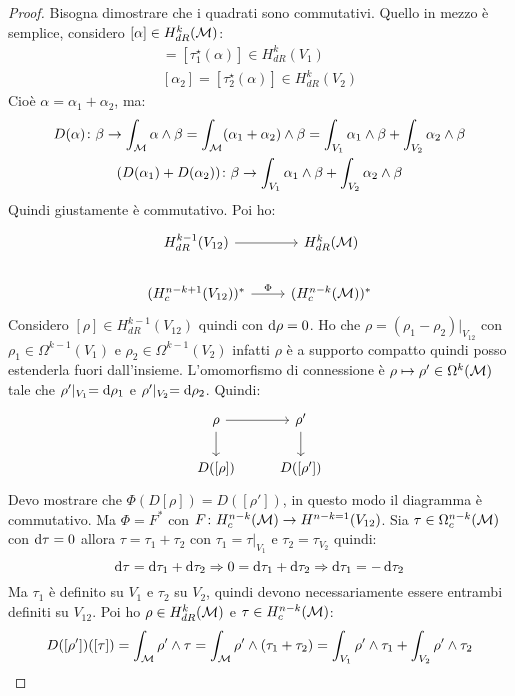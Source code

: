 \begin{proof}
  Bisogna dimostrare che i quadrati sono commutativi. Quello in mezzo è semplice,
  considero $ [\alpha] \in H^k_{dR}(\mathcal{M}) $:
  \begin{gather*}
    [\alpha_1] = [\tau_1^\star(\alpha)] \in H^k_{dR}(V_1) \\
    [\alpha_2] = [\tau_2^\star(\alpha)] \in H^k_{dR}(V_2)
  \end{gather*}
  Cioè $ \alpha = \alpha_1 + \alpha_2 $, ma:
  \begin{gather*}
    D(\alpha) \colon \beta \to \int_{\mathcal{M}} \alpha \wedge \beta =  \int_{\mathcal{M}} (\alpha_1 + \alpha_2) \wedge \beta =  \int_{V_1} \alpha_1 \wedge \beta + \int_{V_2} \alpha_2 \wedge \beta \\
    (D(\alpha_1) + D(\alpha_2)) \colon \beta \to  \int_{V_1} \alpha_1 \wedge \beta +  \int_{V_2} \alpha_2 \wedge \beta
  \end{gather*}
  Quindi giustamente è commutativo.
  Poi ho:
  \[
    \begin{tikzcd}
      H^{k-1}_{dR}(V_{12}) \rar & H^k_{dR}(\M) \\
      (H^{n-k+1}_{c}(V_{12}))^* \rar{\Phi} & (H^{n-k}_{c}(\M))^*
    \end{tikzcd}
  \]
  Considero $ [\rho] \in H^{k-1}_{dR}(V_{12}) $ quindi con $ \operatorname{d}\!{\rho} = 0 $. Ho che
  $ \rho = (\rho_1 - \rho_2) \lvert_{V_{12}} $ con
  $ \rho_1 \in \Omega^{k-1}(V_1) $ e $ \rho_2 \in \Omega^{k-1}(V_2) $ infatti
  $ \rho $ è a supporto compatto quindi posso estenderla fuori dall'insieme.
  L'omomorfismo di connessione è $ \rho \mapsto \rho' \in \Omega^k(\mathcal{M}) $ tale che $ \rho'\lvert_{V_1} = \operatorname{d}\!{\rho}_1 $
  e $ \rho' \lvert_{V_2} = \operatorname{d}\!{\rho}_2 $. Quindi:
  \[
    \begin{tikzcd}
      \rho \rar \dar & \rho' \dar \\
      D([\rho]) & D([\rho'])
    \end{tikzcd}
  \]
  Devo mostrare che $ \Phi(D[\rho]) = D([\rho']) $, in questo modo il diagramma è commutativo.
  Ma $ \Phi = F^* $ con $ F \colon H^{n-k}_c(\mathcal{M}) \to H^{n-k=1}(V_{12}) $. Sia $ \tau \in \Omega_c^{n-k}(\mathcal{M}) $
  con $ \operatorname{d}\!{\tau} = 0 $ allora $ \tau = \tau_1 + \tau_2 $ con $ \tau_1 = \tau \lvert_{V_1} $ e $ \tau_2 = \tau_{V_2} $
  quindi:
  \[
    \operatorname{d}\!{\tau} = \operatorname{d}\!{\tau}_1 + \operatorname{d}\!{\tau}_2 \Rightarrow 0 = \operatorname{d}\!{\tau}_1 + \operatorname{d}\!{\tau}_2 \Rightarrow \operatorname{d}\!{\tau}_1 = - \operatorname{d}\!{\tau}_2
  \]
  Ma $ \tau_1 $ è definito su $ V_1 $ e $ \tau_2 $ su $ V_2 $, quindi devono necessariamente
  essere entrambi definiti su $ V_{12} $.
  Poi ho $ \rho \in H^k_{dR}(\mathcal{M}) $ e $ \tau \in H^{n-k}_c(\mathcal{M}) $:
  \[
    D([\rho'])([\tau]) = \int_{\mathcal{M}} \rho' \wedge \tau = \int_{\mathcal{M}} \rho' \wedge (\tau_1 + \tau_2) = \int_{V_1} \rho' \wedge \tau_1 + \int_{V_2} \rho' \wedge \tau_2
\]
\end{proof}
